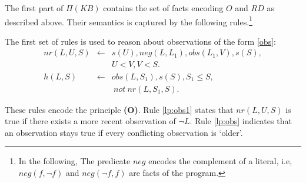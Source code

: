 \documentclass{article}
\def\naf{\: {not} \:}
\begin{document}
%
The first part of $\Pi(KB)$ contains the set of facts encoding $O$ and $RD$ as described above. Their semantics is captured by the following rules.\footnote{In the following, The  predicate $neg$ encodes the complement of a literal, i.e, $neg(f, \neg f)$ and $neg(\neg f, f)$ are facts of the program.}
%

The first set of rules is used to  reason about observations of the form 
\eqref{obs}:
%
\begin{eqnarray}  
  nr(L, U, S)  & \leftarrow &  s(U), neg(L,L_1), obs(L_1, V), s(S), \nonumber  \\
  &&U {<} V, V {<} S.   \label{lp:obs1} \\
h(L, S)  & \leftarrow &   obs(L,S_1), s(S),  S_1 \le S, \nonumber  \\ 
&&\naf nr(L, S_1, S).    \label{lp:obs} 
\end{eqnarray} 

These rules encode the principle {\bf (O)}. Rule \eqref{lp:obs1} states that $nr(L,U,S)$ is true if there exists a more recent observation of  $\neg L$. Rule \eqref{lp:obs} indicates that an observation stays true if every conflicting observation is `older'.
 
\end{document}
